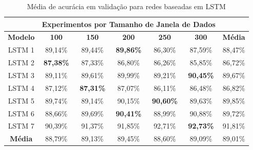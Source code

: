 \begin{table}[H]
\scriptsize
\centering
\caption{Média de acurácia em validação para redes baseadas em LSTM} 
\label{table:lstm_results_tipo_superficie_1}
\begin{tabular}{ccccccc}
\cmidrule(lr){2-6}
& \multicolumn{5}{c}{\textbf{Experimentos por Tamanho de Janela de Dados}} & \multicolumn{1}{c}{} \\ \midrule
\textbf{Modelo} & \multicolumn{1}{c}{\textbf{100}} & \multicolumn{1}{c}{\textbf{150}} & \multicolumn{1}{c}{\textbf{200}} & \multicolumn{1}{c}{\textbf{250}} & \multicolumn{1}{c}{\textbf{300}} & \multicolumn{1}{c}{\textbf{Média}} \\ \midrule
LSTM 1 & 89,14\% & 89,44\% & \textbf{89,86\%} & 86,30\% & 87,59\% & 88,47\% \\ \midrule
LSTM 2 & \textbf{87,38\%} & 87,33\% & 86,80\% & 86,26\% & 85,85\% & 86,72\% \\ \midrule
LSTM 3 & 89,11\% & 89,61\% & 89,99\% & 89,21\% & \textbf{90,45\%} & 89,67\% \\ \midrule
LSTM 4 & 87,12\% & \textbf{87,31\%} & 87,07\% & 86,11\% & 86,48\% & 86,82\% \\ \midrule
LSTM 5 & 89,74\% & 89,14\% & 90,15\% & \textbf{90,60\%} & 89,63\% & 89,85\% \\ \midrule
LSTM 6 & 88,66\% & 89,69\% & \textbf{90,41\%} & 88,99\% & 90,88\% & 89,72\% \\ \midrule
LSTM 7 & 90,39\% & 91,37\% & 91,85\% & 92,71\% & \cellcolor[HTML]{34FF34}\textbf{92,73\%} & 91,81\% \\ \midrule
\textbf{Média} & 88,79\% & 89,13\% & 89,45\% & 88,60\% & 89,09\% & 89,01\% \\ \bottomrule
\end{tabular}
\end{table}


